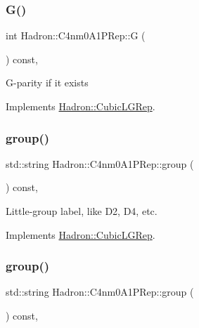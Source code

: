 \subsubsection{\texorpdfstring{G()}{G()}\hspace{0.1cm}{\footnotesize\ttfamily [2/2]}}
{\footnotesize\ttfamily int Hadron\+::\+C4nm0\+A1\+P\+Rep\+::G (\begin{DoxyParamCaption}{ }\end{DoxyParamCaption}) const\hspace{0.3cm}{\ttfamily [inline]}, {\ttfamily [virtual]}}

G-\/parity if it exists 

Implements \mbox{\hyperlink{structHadron_1_1CubicLGRep_ace26f7b2d55e3a668a14cb9026da5231}{Hadron\+::\+Cubic\+L\+G\+Rep}}.

\mbox{\label{structHadron_1_1C4nm0A1PRep_a0c0892a28bdda298fc36d578c433f30e}} 
\subsubsection{\texorpdfstring{group()}{group()}\hspace{0.1cm}{\footnotesize\ttfamily [1/2]}}
{\footnotesize\ttfamily std\+::string Hadron\+::\+C4nm0\+A1\+P\+Rep\+::group (\begin{DoxyParamCaption}{ }\end{DoxyParamCaption}) const\hspace{0.3cm}{\ttfamily [inline]}, {\ttfamily [virtual]}}

Little-\/group label, like D2, D4, etc. 

Implements \mbox{\hyperlink{structHadron_1_1CubicLGRep_a9bdb14b519a611d21379ed96a3a9eb41}{Hadron\+::\+Cubic\+L\+G\+Rep}}.

\mbox{\label{structHadron_1_1C4nm0A1PRep_a0c0892a28bdda298fc36d578c433f30e}} 
\subsubsection{\texorpdfstring{group()}{group()}\hspace{0.1cm}{\footnotesize\ttfamily [2/2]}}
{\footnotesize\ttfamily std\+::string Hadron\+::\+C4nm0\+A1\+P\+Rep\+::group (\begin{DoxyParamCaption}{ }\end{DoxyParamCaption}) const\hspace{0.3cm}{\ttfamily [inline]}, {\ttfamily [virtual]}}

